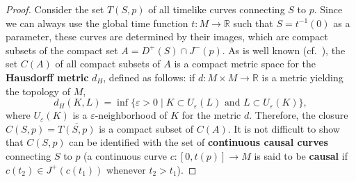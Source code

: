 \documentclass[12pt]{amsart}
\newcommand{\bbR}{\mathbb{R}}      %
\theoremstyle{definition}
\theoremstyle{remark}
\begin{document}
\begin{proof}
Consider the set $T(S,p)$ of all timelike curves connecting $S$ to $p$. Since we can always use the global time function $t:M\to \bbR$ such that $S=t^{-1}(0)$ as a parameter, these curves are determined by their images, which are compact subsets of the compact set $A=D^+(S) \cap J^-(p)$. As is well known (cf.~\cite{Munkres00}), the set $C(A)$ of all compact subsets of $A$ is a compact metric space for the {\bf Hausdorff metric} $d_H$, defined as follows: if $d:M\times M \to \bbR$ is a metric yielding the topology of $M$,
\[
d_H(K,L) = \inf \{ \varepsilon > 0 \mid K \subset U_\varepsilon(L) \text{ and } L \subset U_\varepsilon(K) \},
\]
where $U_{\varepsilon}(K)$ is a $\varepsilon$-neighborhood of $K$ for the metric $d$. Therefore, the closure $C(S,p) = \overline{T(S,p)}$ is a compact subset of $C(A)$. It is not difficult to show that $C(S,p)$ can be identified with the set of {\bf continuous causal curves} connecting $S$ to $p$ (a continuous curve $c:[0,t(p)]\to M$ is said to be {\bf causal} if $c(t_2) \in J^+(c(t_1))$ whenever $t_2 > t_1$).


\end{proof}
\end{document}
